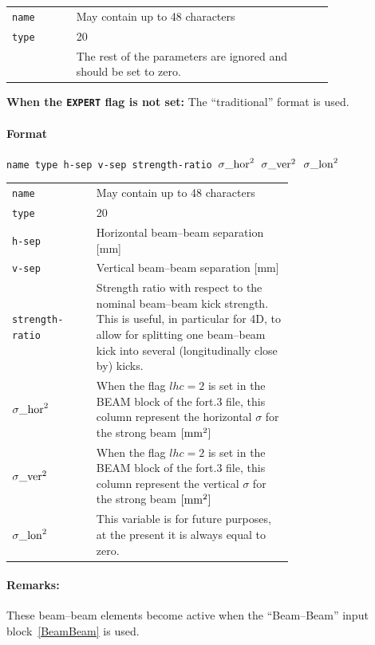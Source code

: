 \bigskip
\begin{tabular}{@{}lp{0.8\linewidth}}
    \texttt{name} & May contain up to 48 characters \\
    \texttt{type} & 20 \\
    \texttt{}     & The rest of the parameters are ignored and should be set to zero.
\end{tabular}

\bigskip
\noindent\textbf{When the \texttt{EXPERT} flag is not set:}
The ``traditional'' format is used.

\paragraph{Format} \texttt{name type h-sep v-sep strength-ratio ${\sigma\_\rm{hor}}^2$ ${\sigma\_\rm{ver}}^2$ ${\sigma\_\rm{lon}}^2$}

\bigskip
\begin{tabular}{@{}lp{0.7\linewidth}}
    \texttt{name}  & May contain up to 48 characters \\
    \texttt{type}  & 20 \\
    \texttt{h-sep} & Horizontal beam--beam separation [mm] \\
    \texttt{v-sep} & Vertical beam--beam separation [mm] \\
    \texttt{strength-ratio} & Strength ratio with respect to the nominal beam--beam kick strength. This is useful, in particular for 4D, to allow for splitting one beam--beam kick into several (longitudinally close by) kicks. \\
    \texttt{${\sigma\_\rm{hor}}^2$} & When the flag $lhc=2$ is set in the BEAM block of the fort.3 file, this column represent the horizontal $\sigma$ for the strong beam $\rm{[mm^2]}$ \\
    \texttt{${\sigma\_\rm{ver}}^2$} & When the flag $lhc=2$ is set in the BEAM block of the fort.3 file, this column represent the vertical $\sigma$ for the strong beam $\rm{[mm^2]}$ \\
    \texttt{${\sigma\_\rm{lon}}^2$} & This variable is for future purposes, at the present it is always equal to zero.
\end{tabular}

\paragraph{Remarks:}
These beam--beam elements become active when the ``Beam--Beam'' input block~\ref{BeamBeam} is used.

